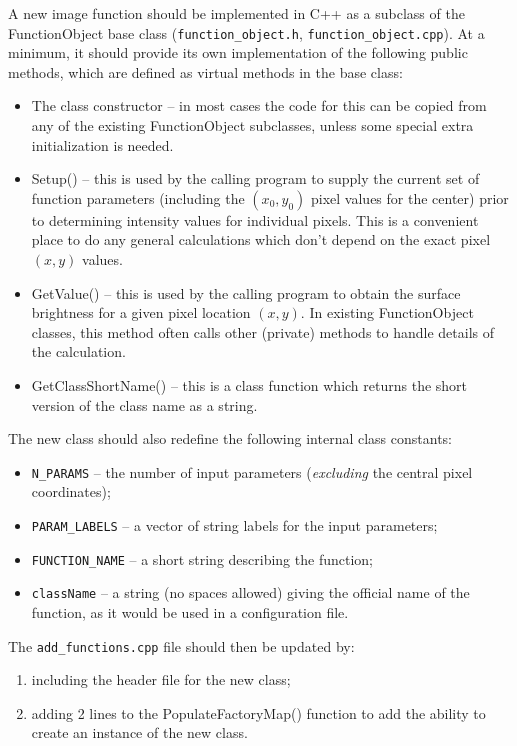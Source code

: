 \documentclass[10pt,a4paper,article]{memoir}
\begin{document}
A new image function should be implemented in C++ as a subclass of
the FunctionObject base class (\texttt{function\_object.h}, \texttt{function\_object.cpp}).
At a minimum, it should provide its own implementation of the following public methods,
which are defined as virtual methods in the base class:
\begin{itemize}
\item The class constructor -- in most cases the code for this can be copied from any of the
existing FunctionObject subclasses, unless some special extra initialization is needed.
\item Setup() -- this is used by the calling program to supply the current set of
function parameters (including the $(x_{0},y_{0})$ pixel values for the center) prior
to determining intensity values for individual pixels. This
is a convenient place to do any general calculations which don't depend on the
exact pixel $(x,y)$ values.
\item GetValue() -- this is used by the calling program to obtain the surface
brightness for a given pixel location $(x,y)$. In existing FunctionObject classes,
this method often calls other (private) methods to handle details of the calculation.
\item GetClassShortName() -- this is a class function which returns
the short version of the class name as a string.

\end{itemize}

The new class should also redefine the following internal class constants:
\begin{itemize}
\item \texttt{N\_PARAMS} -- the number of input parameters (\textit{excluding} the
central pixel coordinates);
\item \texttt{PARAM\_LABELS} -- a vector of string labels for the input parameters;
\item \texttt{FUNCTION\_NAME} -- a short string describing the function;
\item \texttt{className} -- a string (no spaces allowed) giving the official name
of the function, as it would be used in a configuration file.
\end{itemize}

The \texttt{add\_functions.cpp} file should then be updated by:
\begin{enumerate}
\item including the header file for the new class;
\item adding 2 lines to the PopulateFactoryMap() function to add the ability to create an instance of
the new class.
\end{enumerate}
\end{document}
